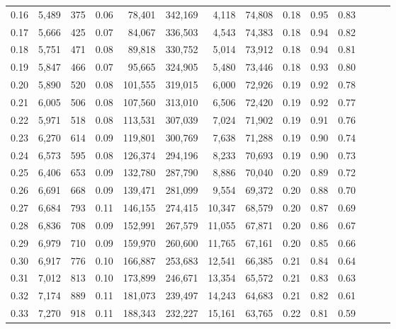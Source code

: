 \begin{tabular}{rrrrrrrrrrrrrr}
0.16 &   5,489 &    375 &  0.06 &   78,401 &  342,169 &   4,118 &  74,808 &  0.18 &  0.95 &      0.83 \\
0.17 &   5,666 &    425 &  0.07 &   84,067 &  336,503 &   4,543 &  74,383 &  0.18 &  0.94 &      0.82 \\
0.18 &   5,751 &    471 &  0.08 &   89,818 &  330,752 &   5,014 &  73,912 &  0.18 &  0.94 &      0.81 \\
0.19 &   5,847 &    466 &  0.07 &   95,665 &  324,905 &   5,480 &  73,446 &  0.18 &  0.93 &      0.80 \\
0.20 &   5,890 &    520 &  0.08 &  101,555 &  319,015 &   6,000 &  72,926 &  0.19 &  0.92 &      0.78 \\
0.21 &   6,005 &    506 &  0.08 &  107,560 &  313,010 &   6,506 &  72,420 &  0.19 &  0.92 &      0.77 \\
0.22 &   5,971 &    518 &  0.08 &  113,531 &  307,039 &   7,024 &  71,902 &  0.19 &  0.91 &      0.76 \\
0.23 &   6,270 &    614 &  0.09 &  119,801 &  300,769 &   7,638 &  71,288 &  0.19 &  0.90 &      0.74 \\
0.24 &   6,573 &    595 &  0.08 &  126,374 &  294,196 &   8,233 &  70,693 &  0.19 &  0.90 &      0.73 \\
0.25 &   6,406 &    653 &  0.09 &  132,780 &  287,790 &   8,886 &  70,040 &  0.20 &  0.89 &      0.72 \\
0.26 &   6,691 &    668 &  0.09 &  139,471 &  281,099 &   9,554 &  69,372 &  0.20 &  0.88 &      0.70 \\
0.27 &   6,684 &    793 &  0.11 &  146,155 &  274,415 &  10,347 &  68,579 &  0.20 &  0.87 &      0.69 \\
0.28 &   6,836 &    708 &  0.09 &  152,991 &  267,579 &  11,055 &  67,871 &  0.20 &  0.86 &      0.67 \\
0.29 &   6,979 &    710 &  0.09 &  159,970 &  260,600 &  11,765 &  67,161 &  0.20 &  0.85 &      0.66 \\
0.30 &   6,917 &    776 &  0.10 &  166,887 &  253,683 &  12,541 &  66,385 &  0.21 &  0.84 &      0.64 \\
0.31 &   7,012 &    813 &  0.10 &  173,899 &  246,671 &  13,354 &  65,572 &  0.21 &  0.83 &      0.63 \\
0.32 &   7,174 &    889 &  0.11 &  181,073 &  239,497 &  14,243 &  64,683 &  0.21 &  0.82 &      0.61 \\
0.33 &   7,270 &    918 &  0.11 &  188,343 &  232,227 &  15,161 &  63,765 &  0.22 &  0.81 &      0.59 \\

\end{tabular}
